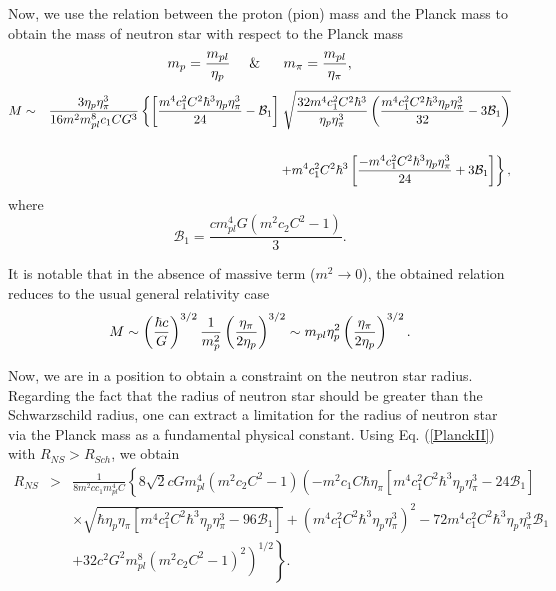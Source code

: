 \documentclass[aps]{revtex4}
\begin{document}
Now, we use the relation between the proton (pion) mass and the Planck mass
\cite{Burrows} to obtain the mass of neutron star with respect to the Planck
mass%
\begin{equation}
m_{p}=\frac{m_{pl}}{\eta _{p}}\ \ \ \ \&\ \ \ \ \ m_{\pi }=\frac{m_{pl}}{%
\eta _{\pi }},  \nonumber
\end{equation}%
\begin{eqnarray}
M &\sim &\frac{3\eta _{p}\eta _{\pi }^{3}}{16m^{2}m_{pl}^{8}c_{1}CG^{3}}%
\left\{ \left[ \frac{m^{4}c_{1}^{2}C^{2}\hbar ^{3}\eta _{p}\eta _{\pi }^{3}}{%
24}-\mathcal{B}_{1}\right] \right. \sqrt{\frac{32m^{4}c_{1}^{2}C^{2}\hbar
^{3}}{\eta _{p}\eta _{\pi }^{3}}\left( \frac{m^{4}c_{1}^{2}C^{2}\hbar
^{3}\eta _{p}\eta _{\pi }^{3}}{32}-3\mathcal{B}_{1}\right) }  \nonumber \\
&&  \nonumber \\
&&\left. +m^{4}c_{1}^{2}C^{2}\hbar ^{3}\left[ \frac{-m^{4}c_{1}^{2}C^{2}%
\hbar ^{3}\eta _{p}\eta _{\pi }^{3}}{24}+3\mathcal{B}_{1}\right] \right\} ,
\label{PlanckII}
\end{eqnarray}%
where%
\begin{equation*}
\mathcal{B}_{1}=\frac{cm_{pl}^{4}G\left( m^{2}c_{2}C^{2}-1\right) }{3}.
\end{equation*}

It is notable that in the absence of massive term ($m^{2}\rightarrow 0$),
the obtained relation reduces to the usual general relativity case
\begin{equation}
M \sim \left( \frac{\hbar c}{G}\right) ^{3/2}\frac{1}{m_{p}^{2}}\left( \frac{%
\eta _{\pi }}{2\eta _{p}}\right) ^{3/2} \sim m_{pl}\eta _{p}^{2}\left( \frac{%
\eta _{\pi }}{2\eta _{p}}\right) ^{3/2}.
\end{equation}

Now, we are in a position to obtain a constraint on the neutron star radius.
Regarding the fact that the radius of neutron star should be greater than
the Schwarzschild radius, one can extract a limitation for the radius of
neutron star via the Planck mass as a fundamental physical constant. Using
Eq. (\ref{PlanckII}) with $R_{NS}>R_{Sch}$, we obtain
\begin{eqnarray}
R_{NS} &>&\frac{1}{8m^{2}cc_{1}m_{pl}^{4}C}\left\{ 8\sqrt{2}%
cGm_{pl}^{4}\left( m^{2}c_{2}C^{2}-1\right) \left( -m^{2}c_{1}C\hbar \eta
_{\pi }\left[ m^{4}c_{1}^{2}C^{2}\hbar ^{3}\eta _{p}\eta _{\pi }^{3}-24%
\mathcal{B}_{1}\right] \right. \right.  \nonumber \\
&&\times \sqrt{\hbar \eta _{p}\eta _{\pi }\left[ m^{4}c_{1}^{2}C^{2}\hbar
^{3}\eta _{p}\eta _{\pi }^{3}-96\mathcal{B}_{1}\right] }+\left(
m^{4}c_{1}^{2}C^{2}\hbar ^{3}\eta _{p}\eta _{\pi }^{3}\right)
^{2}-72m^{4}c_{1}^{2}C^{2}\hbar ^{3}\eta _{p}\eta _{\pi }^{3}\mathcal{B}_{1}
\nonumber \\
&&\left. \left. +32c^{2}G^{2}m_{pl}^{8}\left( m^{2}c_{2}C^{2}-1\right)
^{2}\right) ^{1/2}\right\} .  \label{Rlimit}
\end{eqnarray}
\end{document}
